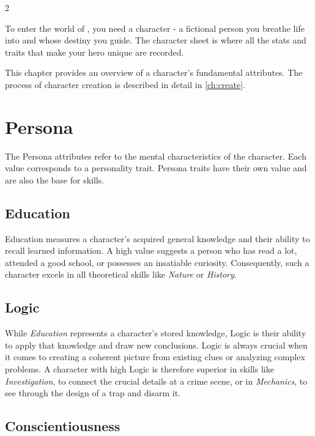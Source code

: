 \label{ch:character}

\begin{multicols}{2}

To enter the world of , you need a character - a fictional person you breathe life into and whose destiny you guide. The character sheet is where all the stats and traits that make your hero unique are recorded.

This chapter provides an overview of a character's fundamental attributes. The process of character creation is described in detail in \cref{ch:create}.

\section{Persona}

The Persona attributes refer to the mental characteristics of the character. Each value corresponds to a personality trait. Persona traits have their own value and are also the base for skills.

\subsection{Education}

Education measures a character's acquired general knowledge and their ability to recall learned information. A high value suggests a person who has read a lot, attended a good school, or possesses an insatiable curiosity. Consequently, such a character excels in all theoretical skills like \textit{Nature} or \textit{History}.

\subsection{Logic}

While \textit{Education} represents a character's stored knowledge, Logic is their ability to apply that knowledge and draw new conclusions. Logic is always crucial when it comes to creating a coherent picture from existing clues or analyzing complex problems. A character with high Logic is therefore superior in skills like \textit{Investigation}, to connect the crucial details at a crime scene, or in \textit{Mechanics}, to see through the design of a trap and disarm it.

\subsection{Conscientiousness}


\end{multicols}
